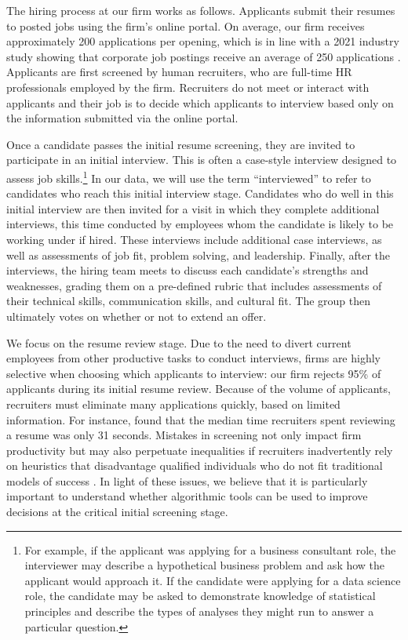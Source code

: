 \documentclass[crop,noquery,editorname,historyrev,nosurname,runningno,sepcount]{RESTUD}
\begin{document}
The hiring process at our firm works as follows.  Applicants submit their resumes to posted jobs using the firm's online portal.  On average, our firm receives approximately 200 applications per opening, which is in line with a 2021 industry study showing that corporate job postings receive an average of 250 applications \citep{fullerHiddenWorkersUntapped}.  Applicants are first screened by human recruiters, who are full-time HR professionals employed by the firm.  Recruiters do not meet or interact with applicants and their job is to decide which applicants to interview based only on the information submitted via the online portal.  

Once a candidate passes the initial resume screening, they are invited to participate in an initial interview. 
This is often a case-style interview designed to assess job skills.\footnote{For example, if the applicant was applying for a business consultant role, the interviewer may describe a hypothetical business problem and ask how the applicant would approach it.  If the candidate were applying for a data science role, the candidate may be asked to demonstrate knowledge of statistical principles and describe the types of analyses they might run to answer a particular question.} 
In our data, we will use the term ``interviewed'' to refer to candidates who reach this initial interview stage.  Candidates who do well in this initial interview are then invited for a visit in which they complete additional interviews, this time conducted by employees whom the candidate is likely to be working under if hired.  These interviews include additional case interviews, as well as assessments of job fit, problem solving, and leadership.  Finally, after the interviews, the hiring team meets to discuss each candidate's strengths and weaknesses, grading them on a pre-defined rubric that includes assessments of their technical skills, communication skills, and cultural fit.  The group then ultimately votes on whether or not to extend an offer.  

We focus on the resume review stage.  Due to the need to divert current employees from other productive tasks to conduct interviews, firms are highly selective when choosing which applicants to interview: our firm rejects 95\% of applicants during its initial resume review.  Because of the volume of applicants, recruiters must eliminate many applications quickly, based on limited information. For instance, \citet{alineresumes2024} found that the median time recruiters spent reviewing a resume was only 31 seconds. Mistakes in screening not only impact firm productivity but may also perpetuate inequalities if recruiters inadvertently rely on heuristics that disadvantage qualified individuals who do not fit traditional models of success \citep{classceiling, Rivera2012}.  In light of these issues, we believe that it is particularly important to understand whether algorithmic tools can be used to improve decisions at the critical initial screening stage.   
\end{document}
